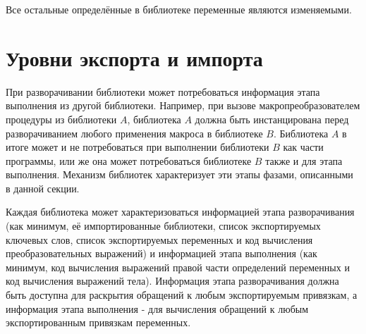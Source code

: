 Все остальные определённые в библиотеке переменные являются изменяемыми.\vspace{-6mm}

\section{Уровни экспорта и импорта}\vspace{-3.8mm}
\label{phasessection}

При разворачивании библиотеки может потребоваться информация этапа выполнения из другой
библиотеки. Например, при вызове макропреобразователем процедуры из библиотеки $A$, библиотека
$A$ должна быть инстанцирована перед разворачиванием любого применения макроса в библиотеке
$B$. Библиотека $A$ в итоге может и не потребоваться при выполнении библиотеки $B$ как части
программы, или же она может потребоваться библиотеке $B$ также и для этапа выполнения.
Механизм библиотек характеризует эти этапы фазами, описанными в данной секции.\vspace{-1.2mm}

Каждая библиотека может характеризоваться информацией этапа разворачивания (как минимум, её
импортированные библиотеки, список экспортируемых ключевых слов, список экспортируемых
переменных и код вычисления преобразовательных выражений) и информацией этапа выполнения
(как минимум, код вычисления выражений правой части определений переменных и код
вычисления выражений тела). Информация этапа разворачивания должна быть доступна для раскрытия
обращений к любым экспортируемым привязкам, а информация этапа выполнения -
для вычисления обращений к любым экспортированным привязкам переменных.\vspace{-1.2mm}


